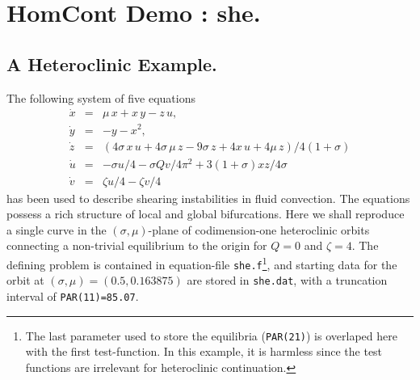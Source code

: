\documentclass[12pt]{report}
\begin{document}
\chapter{ {\cal HomCont} Demo : she.} \label{ch:HomCont_she}

\section{ A Heteroclinic Example.}
The following system of five equations 
\begin{equation} \label{sh1} \begin{array}{rcl}
\dot{x} & = & \mu \, x + x\, y - z\, u, \\
\dot{y} & = & -y - x^2, \\
\dot{z} & = & (4\sigma\, x\, u + 4\sigma\, \mu\, z -9\sigma\, z 
+ 4 x\, u + 4\mu\, z) / 4(1+\sigma)  \\
\dot{u} & = & - \sigma u / 4 - \sigma Q v / 4\pi^2
+ 3(1 + \sigma) x z / 4\sigma \\
\dot{v} & = & \zeta u / 4  - \zeta v / 4
\end{array} 
\end{equation}
has been used to describe shearing instabilities in fluid convection.
The equations possess a rich structure of local and global bifurcations.
Here we shall reproduce a single curve in the $(\sigma,\mu)$-plane
of codimension-one heteroclinic orbits connecting a non-trivial 
equilibrium to the origin for $Q=0$ and $\zeta=4$. The defining
problem is contained in equation-file 
{\tt she.f}\footnote{The last parameter used to store the equilibria ({\tt PAR(21)}) is
overlaped here with the first test-function. In this example, it is harmless since the test functions are 
irrelevant for heteroclinic continuation.}, and starting data for the orbit at 
$(\sigma,\mu)=(0.5,0.163875)$ are stored in {\tt she.dat},
with a truncation interval of {\tt PAR(11)=85.07}.
\end{document}
